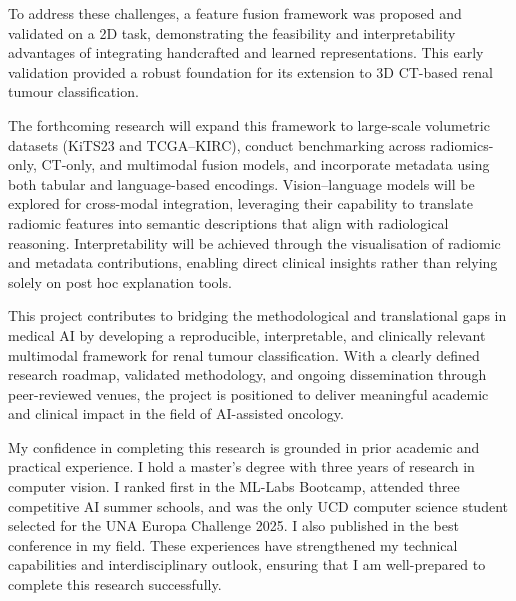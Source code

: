\documentclass[final,british,a4paper,12pt]{phdthesis}
\begin{document}
To address these challenges, a feature fusion framework was proposed and validated on a 2D task, demonstrating the feasibility and interpretability advantages of integrating handcrafted and learned representations. This early validation provided a robust foundation for its extension to 3D CT-based renal tumour classification.

The forthcoming research will expand this framework to large-scale volumetric datasets (KiTS23 and TCGA–KIRC), conduct benchmarking across radiomics-only, CT-only, and multimodal fusion models, and incorporate metadata using both tabular and language-based encodings. Vision–language models will be explored for cross-modal integration, leveraging their capability to translate radiomic features into semantic descriptions that align with radiological reasoning. Interpretability will be achieved through the visualisation of radiomic and metadata contributions, enabling direct clinical insights rather than relying solely on post hoc explanation tools.

This project contributes to bridging the methodological and translational gaps in medical AI by developing a reproducible, interpretable, and clinically relevant multimodal framework for renal tumour classification. With a clearly defined research roadmap, validated methodology, and ongoing dissemination through peer-reviewed venues, the project is positioned to deliver meaningful academic and clinical impact in the field of AI-assisted oncology.

My confidence in completing this research is grounded in prior academic and practical experience. I hold a master's degree with three years of research in computer vision. I ranked first in the ML-Labs Bootcamp, attended three competitive AI summer schools, and was the only UCD computer science student selected for the UNA Europa Challenge 2025. I also published in the best conference in my field. These experiences have strengthened my technical capabilities and interdisciplinary outlook, ensuring that I am well-prepared to complete this research successfully.

\singlespacing



\end{document}
